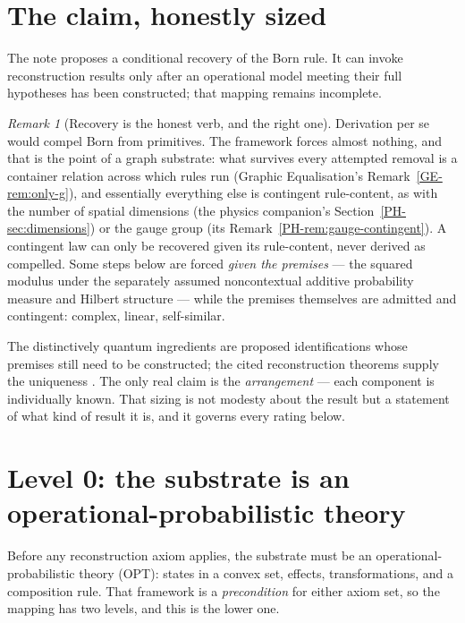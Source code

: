 \documentclass[11pt,a4paper]{article}
\theoremstyle{remark}\newtheorem{remark}[definition]{Remark}
\begin{document}
\section{The claim, honestly sized}\label{sec:claim}
The note proposes a conditional recovery of the Born rule. It can invoke reconstruction results only after an operational model meeting their full hypotheses has been constructed; that mapping remains incomplete.

\begin{remark}[Recovery is the honest verb, and the right one]\label{rem:recover}
Derivation per se would compel Born from primitives. The framework forces almost
nothing, and that is the point of a graph substrate: what survives every
attempted removal is a container relation across which rules run (Graphic
Equalisation's Remark~\ref{GE-rem:only-g}), and essentially everything else is
contingent rule-content, as with the number of spatial dimensions (the physics
companion's Section~\ref{PH-sec:dimensions}) or the gauge group (its
Remark~\ref{PH-rem:gauge-contingent}). A contingent law can only be recovered given its
rule-content, never derived as compelled. Some steps below are forced \emph{given
the premises} --- the squared modulus under the separately assumed noncontextual additive probability measure and Hilbert structure --- while the premises themselves are
admitted and contingent: complex, linear, self-similar.
\end{remark}

The distinctively quantum ingredients are proposed identifications whose premises still need to be constructed; the
cited reconstruction theorems supply the uniqueness
\citep{gleason1957,hardy2001,masanes2011,chiribella2011}. The only real claim is
the \emph{arrangement} --- each component is individually known. That sizing is
not modesty about the result but a statement of what kind of result it is, and it
governs every rating below.

\section{Level 0: the substrate is an operational-probabilistic theory}\label{sec:level0}
Before any reconstruction axiom applies, the substrate must be an
operational-probabilistic theory (OPT): states in a convex set, effects,
transformations, and a composition rule. That framework is a \emph{precondition}
for either axiom set, so the mapping has two levels, and this is the lower one.
\end{document}
